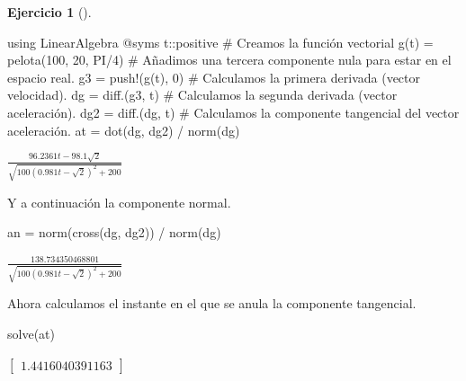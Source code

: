 \documentclass[
  a4paper,
]{scrreport}
\newenvironment{Shaded}{\begin{snugshade}}{\end{snugshade}}
\newcommand{\BuiltInTok}[1]{\textcolor[rgb]{0.00,0.23,0.31}{#1}}
\newcommand{\CommentTok}[1]{\textcolor[rgb]{0.37,0.37,0.37}{#1}}
\newcommand{\DataTypeTok}[1]{\textcolor[rgb]{0.68,0.00,0.00}{#1}}
\newcommand{\FloatTok}[1]{\textcolor[rgb]{0.68,0.00,0.00}{#1}}
\newcommand{\FunctionTok}[1]{\textcolor[rgb]{0.28,0.35,0.67}{#1}}
\newcommand{\ImportTok}[1]{\textcolor[rgb]{0.00,0.46,0.62}{#1}}
\newcommand{\NormalTok}[1]{\textcolor[rgb]{0.00,0.23,0.31}{#1}}
\newcommand{\OperatorTok}[1]{\textcolor[rgb]{0.37,0.37,0.37}{#1}}
\newcommand{\PreprocessorTok}[1]{\textcolor[rgb]{0.68,0.00,0.00}{#1}}
\theoremstyle{definition}
\newtheorem{exercise}{Ejercicio}[chapter]
\theoremstyle{remark}
\begin{document}
\begin{exercise}[]
\begin{enumerate}
\begin{tcolorbox}
\begin{Shaded}
\begin{Highlighting}[]
\ImportTok{using} \BuiltInTok{LinearAlgebra}
\PreprocessorTok{@syms}\NormalTok{ t}\OperatorTok{::}\DataTypeTok{positive}
\CommentTok{\# Creamos la función vectorial}
\FunctionTok{g}\NormalTok{(t) }\OperatorTok{=} \FunctionTok{pelota}\NormalTok{(}\FloatTok{100}\NormalTok{, }\FloatTok{20}\NormalTok{, PI}\OperatorTok{/}\FloatTok{4}\NormalTok{)}
\CommentTok{\# Añadimos una tercera componente nula para estar en el espacio real.}
\NormalTok{g3 }\OperatorTok{=} \FunctionTok{push!}\NormalTok{(}\FunctionTok{g}\NormalTok{(t), }\FloatTok{0}\NormalTok{)}
\CommentTok{\# Calculamos la primera derivada (vector velocidad).}
\NormalTok{dg }\OperatorTok{=} \FunctionTok{diff}\NormalTok{.(g3, t)}
\CommentTok{\# Calculamos la segunda derivada (vector aceleración).}
\NormalTok{dg2 }\OperatorTok{=} \FunctionTok{diff}\NormalTok{.(dg, t)}
\CommentTok{\# Calculamos la componente tangencial del vector aceleración.}
\NormalTok{at }\OperatorTok{=} \FunctionTok{dot}\NormalTok{(dg, dg2) }\OperatorTok{/} \FunctionTok{norm}\NormalTok{(dg)}
\end{Highlighting}
\end{Shaded}

  $\frac{96.2361 t - 98.1 \sqrt{2}}{\sqrt{100 \left(0.981 t - \sqrt{2}\right)^{2} + 200}}$

  Y a continuación la componente normal.

\begin{Shaded}
\begin{Highlighting}[]
\NormalTok{an }\OperatorTok{=} \FunctionTok{norm}\NormalTok{(}\FunctionTok{cross}\NormalTok{(dg, dg2)) }\OperatorTok{/} \FunctionTok{norm}\NormalTok{(dg)}
\end{Highlighting}
\end{Shaded}

  $\frac{138.734350468801}{\sqrt{100 \left(0.981 t - \sqrt{2}\right)^{2} + 200}}$

  Ahora calculamos el instante en el que se anula la componente
  tangencial.

\begin{Shaded}
\begin{Highlighting}[]
\FunctionTok{solve}\NormalTok{(at)}
\end{Highlighting}
\end{Shaded}

  $\left[\begin{smallmatrix}1.4416040391163\end{smallmatrix}\right]$


\end{tcolorbox}
\end{enumerate}
\end{exercise}
\end{document}
